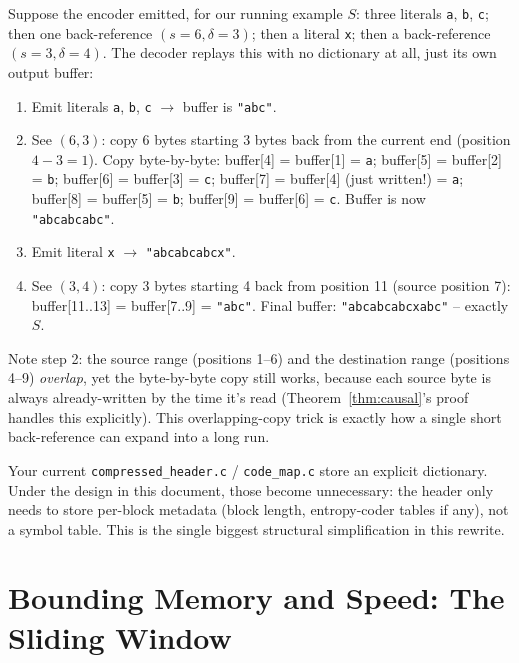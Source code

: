 \documentclass[11pt]{article}
\begin{document}
\begin{tcolorbox}[colback=green!5!white,colframe=green!45!black,title=Worked example: decoding without a dictionary]
Suppose the encoder emitted, for our running example $S$: three literals \texttt{a},
\texttt{b}, \texttt{c}; then one back-reference $(s{=}6,\delta{=}3)$; then a literal
\texttt{x}; then a back-reference $(s{=}3,\delta{=}4)$. The decoder replays this with no
dictionary at all, just its own output buffer:
\begin{enumerate}
  \item Emit literals \texttt{a}, \texttt{b}, \texttt{c} $\to$ buffer is \texttt{"abc"}.
  \item See $(6,3)$: copy 6 bytes starting 3 bytes back from the current end (position
  $4-3=1$). Copy byte-by-byte: buffer[4] = buffer[1] = \texttt{a}; buffer[5] =
  buffer[2] = \texttt{b}; buffer[6] = buffer[3] = \texttt{c}; buffer[7] = buffer[4]
  (just written!) = \texttt{a}; buffer[8] = buffer[5] = \texttt{b}; buffer[9] =
  buffer[6] = \texttt{c}. Buffer is now \texttt{"abcabcabc"}.
  \item Emit literal \texttt{x} $\to$ \texttt{"abcabcabcx"}.
  \item See $(3,4)$: copy 3 bytes starting 4 back from position 11 (source position 7):
  buffer[11..13] = buffer[7..9] = \texttt{"abc"}. Final buffer:
  \texttt{"abcabcabcxabc"} -- exactly $S$.
\end{enumerate}
Note step 2: the source range (positions 1--6) and the destination range (positions
4--9) \emph{overlap}, yet the byte-by-byte copy still works, because each source byte is
always already-written by the time it's read (Theorem~\ref{thm:causal}'s proof handles
this explicitly). This overlapping-copy trick is exactly how a single short back-reference
can expand into a long run.
\end{tcolorbox}

\begin{tcolorbox}[colback=blue!5!white,colframe=blue!50!black,title=What this replaces]
Your current \texttt{compressed\_header.c} / \texttt{code\_map.c} store an explicit
dictionary. Under the design in this document, those become unnecessary: the header
only needs to store per-block metadata (block length, entropy-coder tables if any), not
a symbol table. This is the single biggest structural simplification in this rewrite.
\end{tcolorbox}

\section{Bounding Memory and Speed: The Sliding Window}
\label{sec:window}
\end{document}
